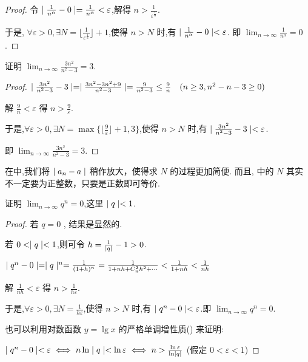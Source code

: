 \begin{proof}
    令 $\mid \frac{1}{n^\alpha}-0 \mid=\frac{1}{n^\alpha}<\varepsilon$,解得 $n>\frac{1}{\varepsilon^{\frac{1}{\alpha}}}$.

    于是,
    $\forall \varepsilon>0,\exists N=\lfloor \frac{1}{\varepsilon^{\frac{1}{\alpha}}} \rfloor + 1$,使得 $n>N$ 时,有 $\mid \frac{1}{n^\alpha}-0 \mid<\varepsilon$. 即 $\lim_{n\to \infty}\frac{1}{n^\alpha}=0$.
\end{proof}

\begin{example}\label{ex:fangda}
    证明 $\lim_{n\to \infty} \frac{3n^2}{n^2-3}=3$.
\end{example}

\begin{proof}
    $\mid \frac{3n^2}{n^2-3}-3 \mid=\mid \frac{3n^2-3n^2+9}{n^2-3} \mid=\frac{9}{n^2-3}\le \frac{9}{n}\quad (n\ge 3,n^2-n-3\ge 0)$

    解 $\frac{9}{n}< \varepsilon$ 得 $n>\frac{9}{\varepsilon}$.

    于是,$\forall \varepsilon>0,\exists N=\max \{ \lfloor \frac{9}{\varepsilon} \rfloor + 1,3\}$,使得 $n>N$ 时,有 $\mid \frac{3n^2}{n^2-3}-3 \mid<\varepsilon$. 
    
    即 $\lim_{n\to \infty} \frac{3n^2}{n^2-3}=3$.
\end{proof}

\begin{annotation}
    在中,我们将 $\mid a_n-a \mid$ 稍作放大，使得求 $N$ 的过程更加简便. 而且, 中的 $N$ 其实不一定要为正整数，只要是正数即可等价.
\end{annotation}

\begin{example}\label{ex:qn}
    证明 $\lim_{n\to \infty} q^n=0$,这里 $\mid q \mid<1$.
\end{example}

\begin{proof}
    若 $q=0$ , 结果是显然的.

    若 $0<\mid q \mid<1$,则可令 $h=\frac{1}{\mid q \mid}-1>0$.

    $\mid q^n-0 \mid=\mid q \mid^n=\frac{1}{(1+h)^n}=\frac{1}{1+nh+C_n^2h^2+\cdots}<\frac{1}{1+nh}<\frac{1}{nh}$

    解 $\frac{1}{nh}<\varepsilon$ 得 $n>\frac{1}{h\varepsilon}$.

    于是,$\forall \varepsilon>0,\exists N=\frac{1}{h\varepsilon}$,使得 $n>N$ 时,有 $\mid q^n-0 \mid<\varepsilon$.即 $\lim_{n\to \infty} q^n=0$.

    也可以利用对数函数 $y=\lg x$ 的严格单调增性质() 来证明:

    $\mid q^n-0 \mid<\varepsilon \iff n\ln \mid q \mid < \ln \varepsilon \iff n>\frac{\ln \varepsilon}{\ln \mid q \mid}$ (假定 $0<\varepsilon<1$)
\end{proof}

